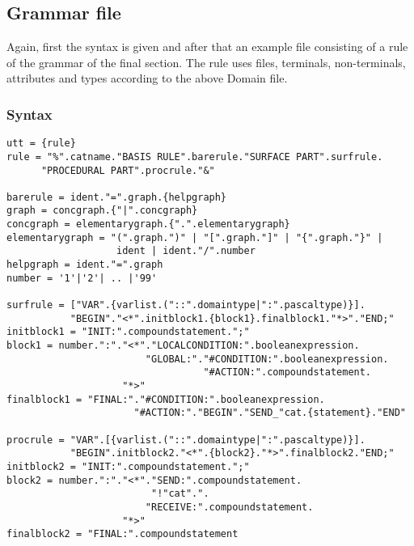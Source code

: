 \subsection{Grammar file}
Again, first the syntax is given and after that an example file consisting
of a rule of the grammar of the final section. The rule uses files, terminals,
non-terminals, attributes and types according to the above Domain file.
\subsubsection{Syntax}
\begin{verbatim}
utt = {rule}
rule = "%".catname."BASIS RULE".barerule."SURFACE PART".surfrule.
      "PROCEDURAL PART".procrule."&"

barerule = ident."=".graph.{helpgraph}
graph = concgraph.{"|".concgraph}
concgraph = elementarygraph.{".".elementarygraph}
elementarygraph = "(".graph.")" | "[".graph."]" | "{".graph."}" |
                   ident | ident."/".number
helpgraph = ident."=".graph
number = '1'|'2'| .. |'99'

surfrule = ["VAR".{varlist.("::".domaintype|":".pascaltype)}].
           "BEGIN"."<*".initblock1.{block1}.finalblock1."*>"."END;"
initblock1 = "INIT:".compoundstatement.";"
block1 = number.":"."<*"."LOCALCONDITION:".booleanexpression.
                        "GLOBAL:"."#CONDITION:".booleanexpression.
                                  "#ACTION:".compoundstatement.
                    "*>"
finalblock1 = "FINAL:"."#CONDITION:".booleanexpression.
                      "#ACTION:"."BEGIN"."SEND_"cat.{statement}."END"

procrule = "VAR".[{varlist.("::".domaintype|":".pascaltype)}].
           "BEGIN".initblock2."<*".{block2}."*>".finalblock2."END;"
initblock2 = "INIT:".compoundstatement.";"
block2 = number.":"."<*"."SEND:".compoundstatement.
                         "!"cat".".
                        "RECEIVE:".compoundstatement.
                    "*>"
finalblock2 = "FINAL:".compoundstatement
\end{verbatim}
